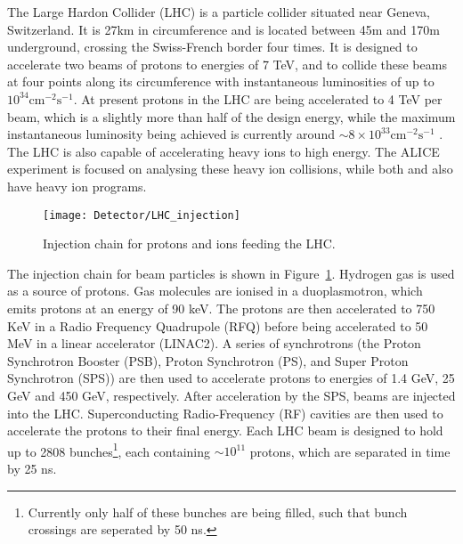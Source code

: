 

The Large Hardon Collider (LHC)\cite{LHC_paper} is a particle collider situated near Geneva, Switzerland. It is  27km in circumference and is located between 45m and 170m underground, crossing the Swiss-French border four times. It is designed to accelerate two beams of protons to energies of 7 TeV, and to collide these beams at four points along its circumference with  instantaneous luminosities of up to $10^{34} \mathrm{cm}^{-2} \mathrm{s}^{-1}$. At present protons in the LHC are being accelerated to 4 TeV per beam, which is a slightly more than half of the design energy, while the maximum instantaneous luminosity being achieved is currently around $\sim 8\times 10^{33} \mathrm{cm}^{-2} \mathrm{s}^{-1}$ . The LHC is also capable of accelerating heavy ions to high energy. The ALICE experiment is focused on analysing these heavy ion collisions, while both \atlas and \cms also have heavy ion programs. %

\begin{figure}[tb]
\begin{center}
\texttt{[image: Detector/LHC\_injection]}
\end{center}
\caption{Injection chain for protons and ions feeding the LHC. }
\label{LHC_inject}
\end{figure}

The injection chain for beam particles is shown in Figure~\ref{LHC_inject}. Hydrogen gas is used as a source of protons. Gas molecules are ionised in a duoplasmotron\cite{LHC_proton_source}, which emits protons at an energy of 90 keV. The protons are then accelerated to 750 KeV in a Radio Frequency Quadrupole (RFQ) before being accelerated to 50 MeV in a linear accelerator (LINAC2). A series of synchrotrons (the Proton Synchrotron Booster (PSB), Proton Synchrotron (PS), and Super Proton Synchrotron (SPS))  are then used to accelerate protons to energies of 1.4 GeV, 25 GeV and 450 GeV, respectively. After acceleration by the SPS, beams are injected into the LHC. Superconducting Radio-Frequency (RF) cavities are then used to accelerate the protons to their final energy.  Each LHC beam is designed to hold up to 2808 bunches\footnote{Currently only half of these bunches are being filled, such that bunch crossings are seperated by 50 ns.}, each containing $\sim 10^{11}$ protons, which are separated in time by 25 ns. 

